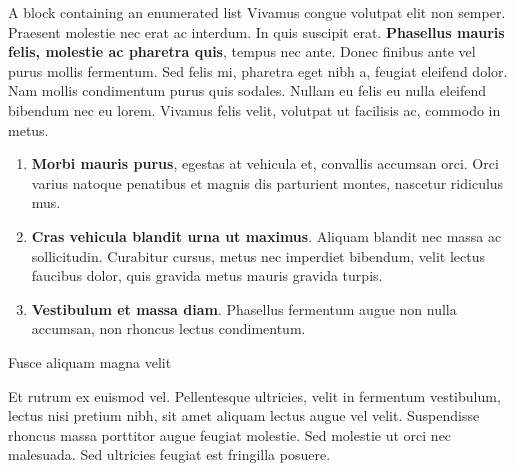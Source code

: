 \documentclass[final]{beamer}
\newlength{\sepwidth}
\newlength{\colwidth}
\newcommand{\separatorcolumn}{\begin{column}{\sepwidth}\end{column}}
\begin{document}
\begin{frame}[t]
\begin{columns}[t]
\begin{column}{\colwidth}
\begin{block}{A block containing an enumerated list}
    Vivamus congue volutpat elit non semper. Praesent molestie nec erat ac
    interdum. In quis suscipit erat. \textbf{Phasellus mauris felis, molestie
    ac pharetra quis}, tempus nec ante. Donec finibus ante vel purus mollis
    fermentum. Sed felis mi, pharetra eget nibh a, feugiat eleifend dolor. Nam
    mollis condimentum purus quis sodales. Nullam eu felis eu nulla eleifend
    bibendum nec eu lorem. Vivamus felis velit, volutpat ut facilisis ac,
    commodo in metus.

    \begin{enumerate}
      \item \textbf{Morbi mauris purus}, egestas at vehicula et, convallis
        accumsan orci. Orci varius natoque penatibus et magnis dis parturient
        montes, nascetur ridiculus mus.
      \item \textbf{Cras vehicula blandit urna ut maximus}. Aliquam blandit nec
        massa ac sollicitudin. Curabitur cursus, metus nec imperdiet bibendum,
        velit lectus faucibus dolor, quis gravida metus mauris gravida turpis.
      \item \textbf{Vestibulum et massa diam}. Phasellus fermentum augue non
        nulla accumsan, non rhoncus lectus condimentum.
    \end{enumerate}

  \end{block}

  \begin{block}{Fusce aliquam magna velit}

    Et rutrum ex euismod vel. Pellentesque ultricies, velit in fermentum
    vestibulum, lectus nisi pretium nibh, sit amet aliquam lectus augue vel
    velit. Suspendisse rhoncus massa porttitor augue feugiat molestie. Sed
    molestie ut orci nec malesuada. Sed ultricies feugiat est fringilla
    posuere.

\begin{columns}[t]
\separatorcolumn

\begin{column}{\colwidth}


\end{column}
\end{columns}
\end{block}
\end{column}
\end{columns}
\end{frame}
\end{document}
